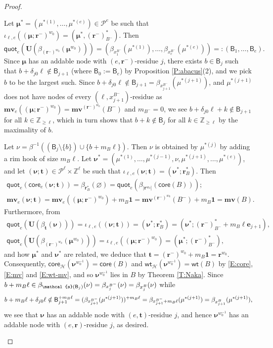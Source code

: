 \documentclass[11pt,a4paper,reqno]{amsart}
\numberwithin{equation}{section}
\theoremstyle{plain}
\theoremstyle{definition}
\theoremstyle{remark}
\numberwithin{equation}{section}
\newcommand{\bone}{\boldsymbol{1}}
\newcommand{\bm}{\boldsymbol{\mu}}
\newcommand{\bnu}{\boldsymbol{\nu}}
\newcommand{\UU}{\mathbf{U}}
\newcommand{\fs}{\mathcal{s}}
\newcommand{\br}{\mathbf{r}}
\newcommand{\bt}{\mathbf{t}}
\newcommand{\wt}{\mathsf{wt}}
\newcommand{\core}{\mathsf{core}}
\newcommand{\quot}{\mathsf{quot}}
\newcommand{\mv}{\mathbf{mv}}
\newcommand{\ZZ}{\mathbb{Z}}
\newcommand{\HH}{\mathcal{H}}
\newcommand{\B}{\mathsf{B}}
\newcommand{\PP}{\mathcal{P}}
\newcommand{\Be}{\mathbf{e}}
\newcommand{\bij}{\iota}
\newcommand{\EP}{\pmb{\varnothing}}
\begin{document}
\begin{proof}
\begin{description}
Let $\bm^* = (\mu^{*(1)}, \dotsc, \mu^{*(e)}) \in \PP^e$ be such that 
$\bij_{\ell,e}((\bm;\br^-)^{w_0}) = (\bm^*, (\br^-)^*_{B^-})$.
Then
$$\quot_e(\UU(\beta_{(\br^{-})^{w_0}}(\bm^{w_0}))) = (\beta_{x^{B^-}_1}(\mu^{*(1)}),\dotsc, \beta_{x^{B^-}_e}(\mu^{*(e)})) =: (\B_1,\dotsc, \B_e).$$
Since $\bm$ has an addable node with $(e,\br^-)$-residue $j$, there exists $b \in \B_j$ such that $b + \delta_{j0} \ell \notin \B_{j+1}$ (where $\B_0 := \B_e$) by Proposition \ref{P:abacus}(2), and we pick $b$ to be the largest such.  
Since $b + \delta_{j0}\ell \notin \B_{j+1} = \beta_{x^{B^-}_{j+1}}(\mu^{*(j+1)})$, and $\mu^{*(j+1)}$ does not have nodes of every $(\ell,x^{B^-}_{j+1})$-residue as $\mv_e((\bm;\br^-)^{w_0})= \mv^{(\br^-)^{w_0}}(B^-)$ and $m_{B^-} = 0$, we see $b+ \delta_{j0}\ell+ k \notin \B_{j+1}$ for all $k \in \ZZ_{\geq \ell}$, which in turn shows that $b+ k \notin \B_j$ for all $k \in \ZZ_{\geq \ell}$ by the maximality of $b$.

Let $\nu = \beta^{-1}((\B_j \setminus \{b \}) \cup \{b + m_B\ell\})$.
Then $\nu$ is obtained by $\mu^{*(j)}$ by adding a rim hook of size $m_B\ell$. Let
$\bnu^* = (\mu^{*(1)}, \dotsc, \mu^{*(j-1)}, \nu, \mu^{*(j+1)}, \dotsc, \mu^{*(e)})$, and let 
$(\bnu;\bt) \in \PP^{\ell} \times \ZZ^{\ell}$ be such that $\bij_{\ell,e}(\bnu;\bt) = (\bnu^*;\br^*_B)$.
Then
\begin{gather}
\quot_e(\core_e(\bnu;\bt)) = \beta_{\br^*_B}(\EP) = \quot_e(\beta_{|\br^{w_0}|}(\core(B))); \label{E:core} \\
\mv_e(\bnu;\bt) = \mv_e((\bm;\br^-)^{w_0}) + m_B\bone = \mv^{(\br^-)^{w_0}}(B^-) + m_B \bone = \mv(B). \label{E:mv}
\end{gather}
Furthermore, from 
\begin{gather*}
\quot_e(\UU(\beta_{\bt}(\bnu))) = \bij_{\ell,e}((\bnu;\bt)) = (\bnu^*;\br^*_B) = (\bnu^*;(\br^-)^*_{B^-} + m_B \ell \Be_{j+1}), \\
\quot_e(\UU(\beta_{(\br^-)^{w_0}}(\bm^{w_0}))) = \bij_{\ell,e}((\bm;\br^-)^{w_0}) = (\bm^*;(\br^-)^*_{B^-}),
\end{gather*} 
and how $\bm^*$ and $\bnu^*$ are related, we deduce that  
$\bt = (\br^-)^{w_0} + m_B \bone = \br^{w_0}.$
Consequently, $\core_{\HH}(\bnu^{w_0^{-1}}) = \core(B)$ and $\wt_{\HH}(\bnu^{w_0^{-1}}) = \wt(B)$ by \eqref{E:core}, \eqref{E:mv} and \eqref{E:wt-mv}, and so $\bnu^{w_0^{-1}}$ lies in $B$ by Theorem \ref{T:Naka}.
Since $b+ m_B\ell \in \beta_{\fs(\B_j)}(\nu) = \beta_{x^{\smash[t]{B^-}}_j}(\nu) = \beta_{x^B_j}(\nu)$ while $$b+ m_B\ell + \delta_{j0}\ell \notin \B_{j+1}^{+m_B\ell} = (\beta_{x^{\smash[t]{B^-}}_{j+1}}(\mu^{*(j+1)}))^{+m_B\ell} 
= \beta_{x^{\smash[t]{B^-}}_{j+1} + m_B\ell}(\mu^{*(j+1)}) = \beta_{x^B_{j+1}}(\mu^{*(j+1)}),$$ we see that $\bnu$ has an addable node with $(e,\bt)$-residue $j$, and hence $\bnu^{w_0^{-1}}$ has an addable node with $(e,\br)$-residue $j$, as desired.
\end{description}
\end{proof}
\end{document}
